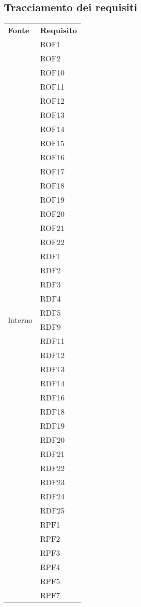 \subsection{Tracciamento dei requisiti}
\begin{longtable}{| p{5cm} | p{5cm} |}
		\rowcolor{LightBlue}
		\color{white}\bfseries Fonte & \color{white}\bfseries Requisito \\[0.25cm]
\multirow[t]{61}{*}{Interno}		
				 & 	ROF1 \\
				&	ROF2 \\
				&	ROF10 \\
				&	ROF11 \\
				&	ROF12 \\
				&	ROF13 \\
				&	ROF14 \\
				&	ROF15 \\
				&	ROF16 \\
				&	ROF17 \\
				&	ROF18 \\
				&	ROF19 \\
				&	ROF20 \\
				&	ROF21 \\
				&	ROF22 \\
				&	RDF1 \\
				&	RDF2 \\
				&	RDF3 \\
				&	RDF4 \\
				&	RDF5 \\
				&	RDF9 \\
				&	RDF11 \\
				&	RDF12 \\
				&	RDF13 \\
				&	RDF14 \\
				&	RDF16 \\
				&	RDF18 \\
				&	RDF19 \\
				&	RDF20 \\
				&	RDF21 \\
				&	RDF22 \\
				&	RDF23 \\
				&	RDF24 \\
				&	RDF25 \\
				&	RPF1 \\
				&	RPF2 \\
				&	RPF3 \\
				&	RPF4 \\
				&	RPF5 \\
				&	RPF7 \\

\end{longtable}

